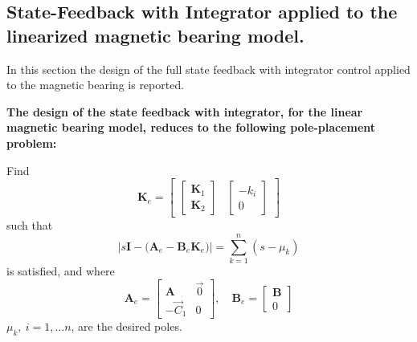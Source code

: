 \documentclass[12pt,a4paper,oneside]{book}
\begin{document}
\begin{onehalfspace}
\subsection{State-Feedback with Integrator applied to the linearized magnetic bearing model.}	
In this section the design of the full state feedback with integrator control applied to the magnetic bearing is reported.

\begin{mybox}
	\textbf{The design of the state feedback with integrator, for the linear magnetic bearing model, reduces to the following pole-placement problem:} 
	
	\noindent Find 
	\begin{equation}\label{sf_mb_ctrl_eq1}
		{\mathbf{K}}_e = \begin{bmatrix}
			\begin{bmatrix}
				\mathbf{K}_1 \\[6pt] \mathbf{K}_2
			\end{bmatrix} & \begin{bmatrix}
				-k_i \\[6pt] 0
			\end{bmatrix}
		\end{bmatrix}
	\end{equation}
	such that
	\begin{equation}\label{sf_mb_ctrl_eq2}
		\Bigg|s\mathbf{I}-\Big({\mathbf{A}}_e - 
		{\mathbf{B}}_e {\mathbf{K}}_e \Big)\Bigg|=\sum_{k=1}^{n}(s-\mu_k)
	\end{equation}
	is satisfied, and where
	\begin{equation}\label{sf_mb_ctrl_eq3}
		{\mathbf{A}}_e  = 
		\begin{bmatrix}
			{\mathbf{A}} & \vec{0} \\[6pt]
			-{\vec{C}_1} & 0
		\end{bmatrix}, \quad
		{\mathbf{B}}_e  = 
		\begin{bmatrix}
			{\mathbf{B}} \\[6pt] 0
		\end{bmatrix}
	\end{equation} 
	$\mu_k,\ i=1,\dots n$, are the desired poles.
	

\end{mybox}
\end{onehalfspace}
\end{document}
